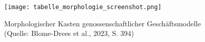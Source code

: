 \clearpage
\begin{landscape}
\begin{figure}[htbp]
\centering
\texttt{[image: tabelle\_morphologie\_screenshot.png]}
\caption{Morphologischer Kasten genossenschaftlicher Geschäftsmodelle (Quelle: Blome-Drees et al., 2023, S. 394)}
\label{tab:morphologischer_kasten}
\end{figure}
\end{landscape}
\clearpage
